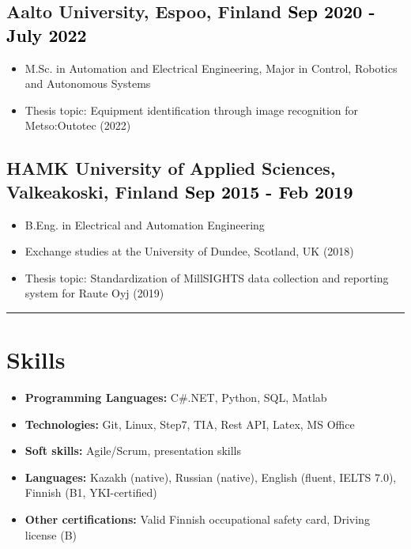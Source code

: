 \documentclass[a4paper,10pt]{article}
\begin{document}
\subsection*{Aalto University, Espoo, Finland \hfill \textcolor{black}{Sep 2020 - July 2022}}
\begin{itemize}
    \item M.Sc. in Automation and Electrical Engineering, Major in Control, Robotics and Autonomous Systems
    \item Thesis topic: Equipment identification through image recognition for Metso:Outotec (2022)
\end{itemize}

\subsection*{HAMK University of Applied Sciences, Valkeakoski, Finland \hfill \textcolor{black}{Sep 2015 - Feb 2019}}
\begin{itemize}
    \item B.Eng. in Electrical and Automation Engineering
    \item Exchange studies at the University of Dundee, Scotland, UK (2018)
    \item Thesis topic: Standardization of MillSIGHTS data collection and reporting system for Raute Oyj (2019)
\end{itemize}

\vspace{0.2cm}
\hrule
\vspace{0.1cm}

\section*{Skills}
\begin{itemize}
    \item \textbf{Programming Languages:} C\#.NET, Python,  SQL, Matlab
    \item \textbf{Technologies:} Git, Linux, Step7, TIA, Rest API, Latex, MS Office
    \item \textbf{Soft skills:} Agile/Scrum, presentation skills
    \item \textbf{Languages:} Kazakh (native), Russian (native), English (fluent, IELTS 7.0), Finnish (B1, YKI-certified)
    \item \textbf{Other certifications:} Valid Finnish occupational safety card, Driving license (B)
\end{itemize}
\end{document}
